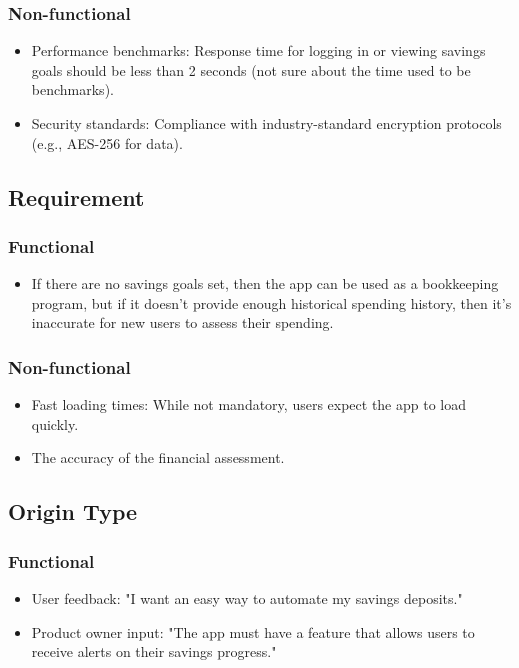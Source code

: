 \documentclass{article}
\begin{document}
\subsubsection{Non-functional}
\begin{itemize}
    \item Performance benchmarks: Response time for logging in or viewing savings goals should be less than 2 seconds (not sure about the time used to be benchmarks).
    \item Security standards: Compliance with industry-standard encryption protocols (e.g., AES-256 for data).
\end{itemize}

\subsection{Requirement}
\subsubsection{Functional}
\begin{itemize}
    \item If there are no savings goals set, then the app can be used as a bookkeeping program, but if it doesn’t provide enough historical spending history, then it's inaccurate for new users to assess their spending.
\end{itemize}
\subsubsection{Non-functional}
\begin{itemize}
    \item Fast loading times: While not mandatory, users expect the app to load quickly.
    \item The accuracy of the financial assessment.
\end{itemize}

\subsection{Origin Type}
\subsubsection{Functional}
\begin{itemize}
    \item User feedback: "I want an easy way to automate my savings deposits."
    \item Product owner input: "The app must have a feature that allows users to receive alerts on their savings progress."
\end{itemize}
\end{document}

